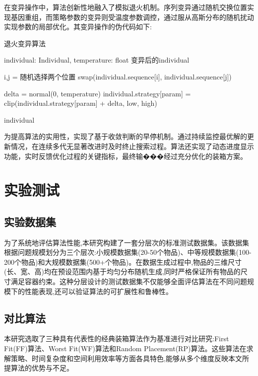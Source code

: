 \documentclass[UTF8]{ctexart}
\begin{document}
在变异操作中，算法创新性地融入了模拟退火机制。序列变异通过随机交换位置实现基因重组，而策略参数的变异则受温度参数调控，通过服从高斯分布的随机扰动实现参数的局部优化。其变异操作的伪代码如下:

\begin{algorithm}[!h]
\caption{退火变异算法}
\begin{algorithmic}[1]
\REQUIRE individual: Individual, temperature: float
\ENSURE 变异后的individual

    \STATE i,j = 随机选择两个位置
    \STATE swap(individual.sequence[i], individual.sequence[j])
\ENDIF

        \STATE delta = normal(0, temperature)
        \STATE individual.strategy[param] = clip(individual.strategy[param] + delta, low, high)
    \ENDIF
\ENDFOR

\RETURN individual
\end{algorithmic}
\end{algorithm}

为提高算法的实用性，实现了基于收敛判断的早停机制。通过持续监控最优解的更新情况，在连续多代无显著改进时及时终止搜索过程。算法还实现了动态进度显示功能，实时反馈优化过程的关键指标，最终输���经过充分优化的装箱方案。
\section{实验测试}
\subsection{实验数据集}

为了系统地评估算法性能,本研究构建了一套分层次的标准测试数据集。该数据集根据问题规模划分为三个层次:小规模数据集(20-50个物品)、中等规模数据集(100-200个物品)和大规模数据集(500+个物品)。在数据生成过程中,物品的三维尺寸(长、宽、高)均在预设范围内基于均匀分布随机生成,同时严格保证所有物品的尺寸满足容器约束。这种分层设计的测试数据集不仅能够全面评估算法在不同问题规模下的性能表现,还可以验证算法的可扩展性和鲁棒性。

\subsection{对比算法}

本研究选取了三种具有代表性的经典装箱算法作为基准进行对比研究:First Fit(FF)算法、Worst Fit(WF)算法和Random Placement(RP)算法。这些算法在求解策略、时间复杂度和空间利用效率等方面各具特色,能够从多个维度反映本文所提算法的优势与不足。
\end{document}
